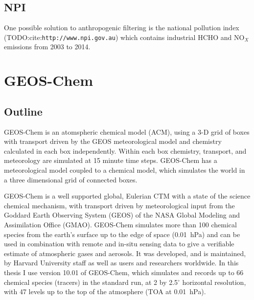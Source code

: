   \subsection{NPI}
    
    One possible solution to anthropogenic filtering is the national pollution index (TODO:cite:\verb|http://www.npi.gov.au|) which contains industrial HCHO and NO$_X$ emissions from 2003 to 2014.
  
\section{GEOS-Chem}
  \label{Model:GC}

  \subsection{Outline}
    GEOS-Chem is an atomspheric chemical model (ACM), using a 3-D grid of boxes with transport driven by the GEOS meteorological model and chemistry calculated in each box independently. 
    Within each box chemistry, transport, and meteorology are simulated at 15 minute time steps.
    GEOS-Chem has a meteorological model coupled to a chemical model, which simulates the world in a three dimensional grid of connected boxes.
    
    GEOS-Chem is a well supported global, Eulerian CTM with a state of the science chemical mechanism, with transport driven by meteorological input from the Goddard Earth Observing System (GEOS) of the NASA Global Modeling and Assimilation Office (GMAO).
    GEOS-Chem simulates more than 100 chemical species from the earth's surface up to the edge of space (0.01~hPa) and can be used in combination with remote and in-situ sensing data to give a verifiable estimate of atmospheric gases and aerosols.
    It was developed, and is maintained, by Harvard University staff as well as users and researchers worldwide.
    In this thesis I use version 10.01 of GEOS-Chem, which simulates and records up to 66 chemical species (tracers) in the standard run, at 2 by 2.5$^{\circ}$ horizontal resolution, with 47 levels up to the top of the atmosphere (TOA at 0.01~hPa). 
    
